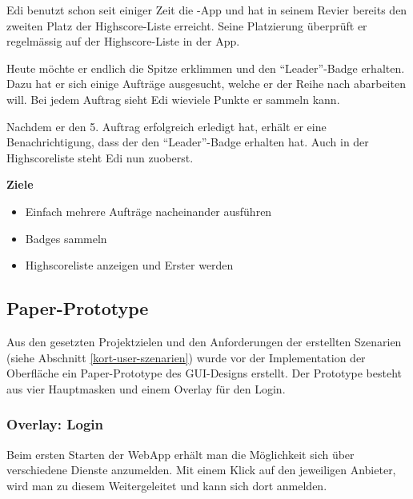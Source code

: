 Edi benutzt schon seit einiger Zeit die \kort-App und hat in seinem Revier bereits den zweiten Platz der Highscore-Liste erreicht.
Seine Platzierung überprüft er regelmässig auf der Highscore-Liste in der App.

Heute möchte er endlich die Spitze erklimmen und den "`Leader"'-Badge erhalten.
Dazu hat er sich einige Aufträge ausgesucht, welche er der Reihe nach abarbeiten will.
Bei jedem Auftrag sieht Edi wieviele Punkte er sammeln kann.

Nachdem er den 5. Auftrag erfolgreich erledigt hat, erhält er eine Benachrichtigung, dass der den "`Leader"'-Badge erhalten hat.
Auch in der Highscoreliste steht Edi nun zuoberst.

\textbf{Ziele}
\begin{itemize}
\item Einfach mehrere Aufträge nacheinander ausführen
\item Badges sammeln
\item Highscoreliste anzeigen und Erster werden
\end{itemize}

\subsection{Paper-Prototype}
\setcounter{subfigure}{0}

Aus den gesetzten Projektzielen und den Anforderungen der erstellten Szenarien (siehe Abschnitt \ref{kort-user-szenarien}) wurde vor der Implementation der Oberfläche ein Paper-Prototype des GUI-Designs erstellt.
Der Prototype besteht aus vier Hauptmasken und einem Overlay für den Login.

\subsubsection{Overlay: Login}
Beim ersten Starten der \gls{WebApp} erhält man die Möglichkeit sich über verschiedene Dienste anzumelden.
Mit einem Klick auf den jeweiligen Anbieter, wird man zu diesem Weitergeleitet und kann sich dort anmelden.


